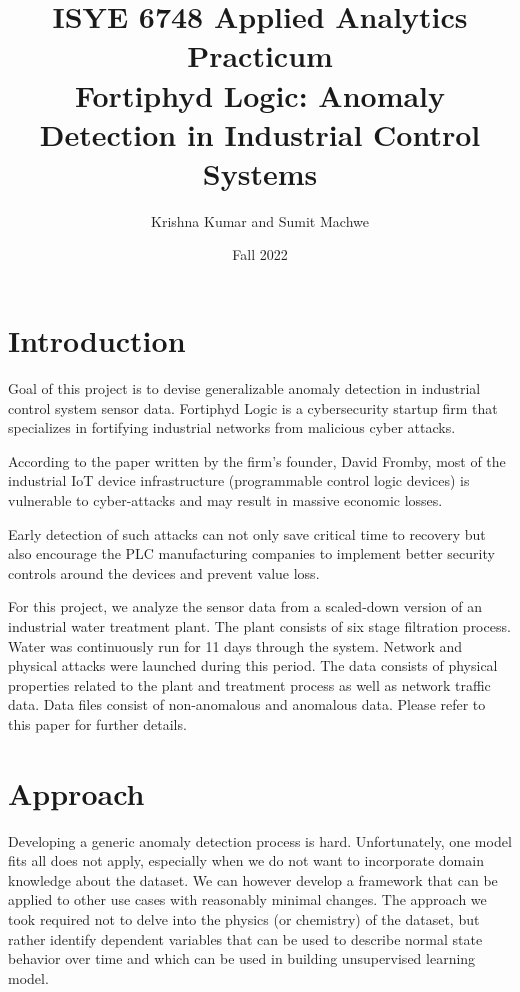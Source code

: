 \documentclass{article}
\title{ISYE 6748 Applied Analytics Practicum \\
Fortiphyd Logic: Anomaly Detection in Industrial Control Systems}
\author{Krishna Kumar and Sumit Machwe}
\date{Fall 2022}
\begin{document}
\maketitle

\tableofcontents
{}

\section{Introduction}
\setlength{\parskip}{5pt}
\leftskip 10pt
Goal of this project is to devise generalizable anomaly detection in industrial control system sensor data. Fortiphyd Logic is a cybersecurity startup firm that specializes in fortifying industrial networks from malicious cyber attacks. \par
According to the paper\cite{one} written by the firm's founder, David Fromby, most of the industrial IoT device infrastructure (programmable control logic devices) is vulnerable to cyber-attacks and may result in massive economic losses. \par
Early detection of such attacks can not only save critical time to recovery but also encourage the PLC manufacturing companies to implement better security controls around the devices and prevent value loss. \par
For this project, we analyze the sensor data from a scaled-down version of an industrial water treatment plant. The plant consists of six stage filtration process. Water was continuously run for 11 days through the system. Network and physical attacks were launched during this period. The data consists of physical properties related to the plant and treatment process as well as network traffic data. Data files consist of non-anomalous and anomalous data. Please refer to this paper for further details\cite{two}.\par

\section{Approach}

Developing a generic anomaly detection process is hard. Unfortunately, one model fits all does not apply, especially when we do not want to incorporate domain knowledge about the dataset. We can however develop a framework that can be applied to other use cases with reasonably minimal changes. The approach we took required not to delve into the physics (or chemistry) of the dataset, but rather identify dependent variables that can be used to describe normal state behavior over time and which can be used in building unsupervised learning model.\par
\end{document}
